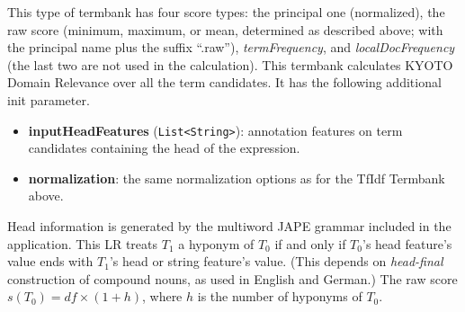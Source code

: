 This type of termbank has four score types: the principal one (normalized), the
raw score (minimum, maximum, or mean, determined as described above; with the
principal name plus the suffix ``.raw''), \emph{termFrequency}, and
\emph{localDocFrequency} (the last two are not used in the calculation).
This termbank calculates KYOTO Domain Relevance \cite{Bosma2010} over all the
term candidates.  It has the following additional init parameter.
\begin{itemize}
\item \textbf{inputHeadFeatures} (\texttt{List<String>}): annotation features on
  term candidates containing the head of the expression.
\item \textbf{normalization}: the same normalization options as for the TfIdf
  Termbank above.
\end{itemize}
Head information is generated by the multiword JAPE grammar included in the
application.  This LR treats $T_1$ a hyponym of $T_0$ if and only if $T_0$'s
head feature's value ends with $T_1$'s head or string feature's value.  (This
depends on \emph{head-final} construction of compound nouns, as used in English
and German.)  The raw score $s(T_0)=\mathit{df}\times(1+h)$, where $h$ is the
number of hyponyms of $T_0$.

